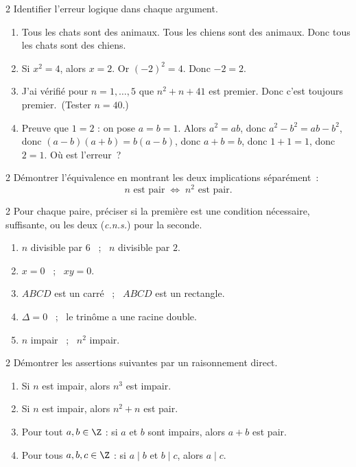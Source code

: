 \begin{exo}{2}
Identifier l'erreur logique dans chaque argument.
\begin{enumerate}
  \item \og Tous les chats sont des animaux. Tous les chiens sont des animaux.
        Donc tous les chats sont des chiens.\fg
  \item \og Si $x^2 = 4$, alors $x = 2$. Or $(-2)^2 = 4$. Donc $-2 = 2$.\fg
  \item \og J'ai v\'erifi\'e pour $n=1,\ldots,5$ que $n^2+n+41$ est premier.
        Donc c'est toujours premier.\fg\ (Tester $n=40$.)
  \item Preuve que $1 = 2$ : on pose $a=b=1$.
        Alors $a^2 = ab$, donc $a^2 - b^2 = ab - b^2$,
        donc $(a-b)(a+b) = b(a-b)$,
        donc $a+b = b$, donc $1+1=1$, donc $2=1$.
        O\`u est l'erreur~?
\end{enumerate}
\end{exo}

\begin{exo}{2}
D\'emontrer l'\'equivalence en montrant les deux implications s\'epar\'ement~:
$$n \text{ est pair} \;\Leftrightarrow\; n^2 \text{ est pair}.$$
\end{exo}

\begin{exo}{2}
Pour chaque paire, pr\'eciser si la premi\`ere est une condition
n\'ecessaire, suffisante, ou les deux (\textit{c.n.s.}) pour la seconde.
\begin{enumerate}
  \item $n$ divisible par $6$ ~;~ $n$ divisible par $2$.
  \item $x = 0$ ~;~ $xy = 0$.
  \item $ABCD$ est un carr\'e ~;~ $ABCD$ est un rectangle.
  \item $\Delta = 0$ ~;~ le trin\^{o}me a une racine double.
  \item $n$ impair ~;~ $n^2$ impair.
\end{enumerate}
\end{exo}

\begin{exo}{2}
D\'emontrer les assertions suivantes par un raisonnement direct.
\begin{enumerate}
  \item Si $n$ est impair, alors $n^3$ est impair.
  \item Si $n$ est impair, alors $n^2 + n$ est pair.
  \item Pour tout $a, b \in \Z$ : si $a$ et $b$ sont impairs,
        alors $a + b$ est pair.
  \item Pour tous $a, b, c \in \Z$ : si $a \mid b$ et $b \mid c$, alors $a \mid c$.
\end{enumerate}
\end{exo}

